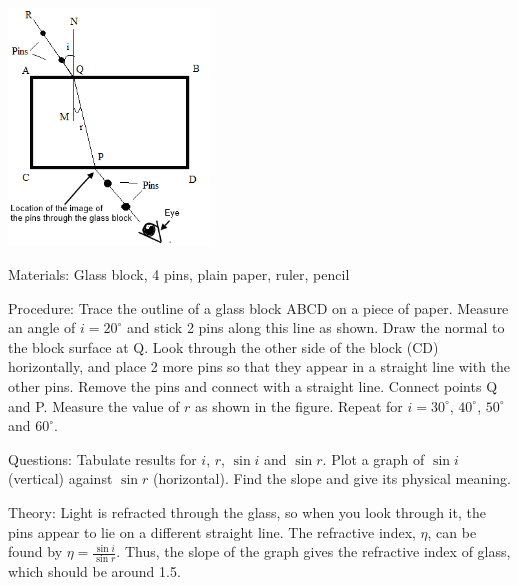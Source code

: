 \begin{multicols}{2}
\begin{center}
\includegraphics[width=0.4\textwidth]{./img/refractive-index-1.png}
\end{center}

\begin{description*}
\item[Materials:]{Glass block, 4 pins, plain paper, ruler, pencil}
\item[Procedure:]{Trace the outline of a glass block ABCD on a piece of paper. Measure an angle of $i=20^\circ$ and stick 2 pins along this line as shown. Draw the normal to the block surface at Q. Look through the other side of the block (CD) horizontally, and place 2 more pins so that they appear in a straight line with the other pins. Remove the pins and connect with a straight line. Connect points Q and P. Measure the value of $r$ as shown in the figure. Repeat for $i=30^\circ$, $40^\circ$, $50^\circ$ and $60^\circ$.}
\item[Questions:]{Tabulate results for $i$, $r$, $\sin{i}$ and $\sin{r}$. Plot a graph of $\sin{i}$ (vertical) against $\sin{r}$ (horizontal). Find the slope and give its physical meaning.}
\item[Theory:]{Light is refracted through the glass, so when you look through it, the pins appear to lie on a different straight line. The refractive index, $\eta$, can be found by $\eta = \frac{\sin{i}}{\sin{r}}$. Thus, the slope of the graph gives the refractive index of glass, which should be around 1.5.}
\end{description*}


\end{multicols}
